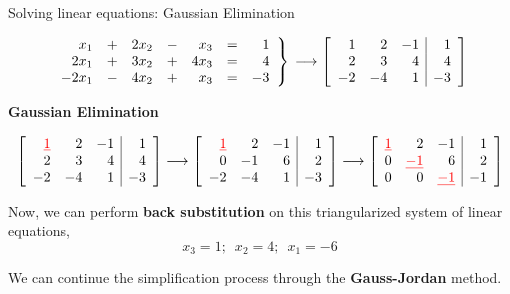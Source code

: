\documentclass[aspectratio=169]{beamer}
\begin{document}
\begin{frame}[t]{Solving linear equations: Gaussian Elimination}
\begin{small}
\[
\begin{rcases*}
\begin{array}{rrrrrrr}
x_1 &+& 2x_2 &-& x_3 & =& 1 \\
2x_1 &+& 3x_2 &+& 4x_3  & =& 4 \\
-2x_1 &-& 4x_2 &+& x_3  & =& -3 \\
\end{array}
\end{rcases*} \, \longrightarrow \left[
\begin{array}{rrr|r}
1& 2 & -1 & 1 \\
2 & 3 & 4 & 4 \\
-2 & -4 & 1 & -3 \\
\end{array}
\right]
\]
\end{small}

\noindent \textbf{Gaussian Elimination}
\begin{small}
\[
\left[
\begin{array}{rrr|r}
\color{red}{\underline{1}} & 2 & -1 & 1 \\
2 & 3 & 4 & 4 \\
-2 & -4 & 1 & -3 \\
\end{array}
\right] \longrightarrow
\left[
\begin{array}{rrr|r}
\color{red}{\underline{1}} & 2 & -1 & 1 \\
0 & -1 & 6 & 2 \\
-2 & -4 & 1 & -3 \\
\end{array}
\right] \longrightarrow
\left[
\begin{array}{rrr|r}
\color{red}{\underline{1}} & 2 & -1 & 1 \\
0 & \color{red}{\underline{-1}} & 6 & 2 \\
0 & 0 & \color{red}{\underline{-1}} & -1 \\
\end{array}
\right]
\]
\end{small}

\noindent Now, we can perform \textbf{back substitution} on this triangularized system of linear equations,
\[ x_3 = 1; \,\,\, x_2 = 4; \,\,\, x_1 = -6 \]

We can continue the simplification process through the \textbf{Gauss-Jordan} method.
\end{frame}
\end{document}
